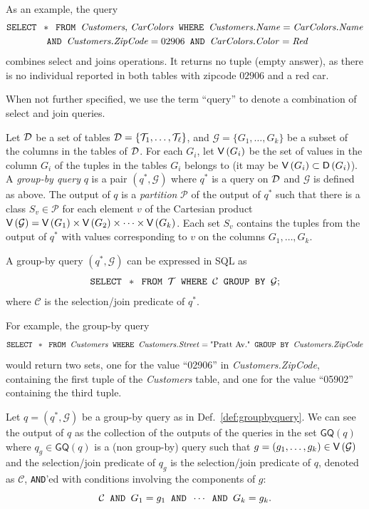 As an example, the query 
\begin{align*}
\mbox{\texttt{SELECT }} &* \mbox{\texttt{ FROM }} \mbox{\emph{Customers},
\emph{CarColors}} \mbox{\texttt{ WHERE }} 
\mbox{\emph{Customers.Name}} = \mbox{\emph{CarColors.Name}} \\
& \mbox{\texttt{ AND }} \mbox{\emph{Customers.ZipCode}}=02906 \mbox{\texttt{ AND }} \mbox{\emph{CarColors.Color}}=\mbox{\emph{Red}}
\end{align*}
combines select and joins operations. It returns no tuple (empty answer), as
there is no individual reported in both tables with zipcode $02906$ and a red
car.

When not further specified, we use the term ``query'' to denote a combination of
select and join queries.

\begin{definition}\label{def:groupbyquery}
  Let ${\cal D}$ be a set of tables ${\cal D}=\{{\cal T}_1,\dotsc,{\cal T}_\ell\}$, and
  $\mathcal{G}=\{G_1,\dotsc,G_k\}$ be a subset of the columns in the tables of ${\cal D}$. For
  each $G_i$, let $\mathsf{V}\left(G_i\right)$ be the set of values in the column
  $G_i$ of the tuples in the tables $G_i$ belongs to (it may be $\mathsf{V}\left(G_i\right)\subset
  \mathsf{D}\left(G_i\right)$). A \emph{group-by query} $q$ is a pair $(q^*,\mathcal{G})$ where $q^*$ is a query
  on ${\cal D}$ and $\mathcal{G}$ is defined as above.  The output of $q$ is a
  \emph{partition} $\mathcal{P}$ of the output of $q^*$ such that there is a
  class $S_v\in\mathcal{P}$ for each element $v$ of the Cartesian product
  $\mathsf{V}\left(\mathcal{G}\right)=\mathsf{V}\left(G_1\right)\times \mathsf{V}\left(G_2\right)\times\dotsb\times
  \mathsf{V}\left(G_k\right)$. Each set $S_v$ contains the tuples from the output of $q^*$
  with values corresponding to $v$ on the columns $G_1,\dotsc,G_k$.

  A group-by query $(q^*,\mathcal{G})$ can be expressed in SQL as
  \[
  \mbox{\texttt{SELECT }} * \mbox{\texttt{ FROM }} {\cal T} \mbox{\texttt{ WHERE }} \mathcal{C} \mbox{\texttt{ GROUP BY }} \mathcal{G};
   \]
  where $\mathcal{C}$ is the selection/join predicate of $q^*$.
\end{definition}
For example, the group-by query
\[
\mbox{\texttt{SELECT }} * \mbox{\texttt{ FROM }} \mbox{\emph{Customers}}  \mbox{\texttt{ WHERE }} \mbox{\emph{Customers.Street}} =
\mbox{"Pratt Av."} \mbox{\texttt{ GROUP BY }} \mbox{\emph{Customers.ZipCode}}
\]
would return two sets, one for the value ``02906'' in \emph{Customers.ZipCode},
containing the first tuple of the \emph{Customers}
table, and one for the value ``05902'' containing the third tuple.

\begin{fact}\label{fact:groupbyequiv}
  Let $q=(q^*,\mathcal{G})$ be a group-by query as in Def.~\ref{def:groupbyquery}. 
  We can see the output of $q$ as the collection of the outputs of the queries
  in the set $\mathsf{GQ}(q)$ where $q_g\in \mathsf{GQ}(q)$ is a (non group-by)
  query such that $g=(g_1,\dotsc,g_k)\in \mathsf{V}\left(\mathcal{G}\right)$ and the
  selection/join predicate of $q_g$ is the selection/join predicate of $q$,
  denoted as $\mathcal{C}$, \texttt{AND}'ed with conditions involving the
  components of $g$:
  \begin{equation}\label{eq:groupbyequiv}
    \mathcal{C} \mbox{\texttt{ AND }} G_1=g_1 \mbox{\texttt{ AND }} \dotsb \mbox{\texttt{ AND }} G_k=g_k.
  \end{equation}
\end{fact}

